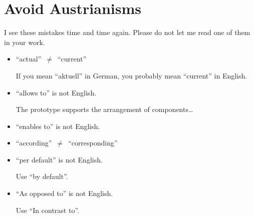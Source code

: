 \section{Avoid Austrianisms}
\label{sec:Austrianisms}


I see these mistakes time and time again. Please do not
let me read one of them in your work.



\begin{itemize}


\item \enquote{actual}~$\ne$~\enquote{current} 

If you mean \enquote{aktuell} in German, you probably mean
\enquote{current} in English.





\item \enquote{allows to} is not English.

{The prototype supports the arrangement of components\ldots}




\item \enquote{enables to} is not English.




\item \enquote{according}~$\ne$~\enquote{corresponding} 




\item \enquote{per default} is not English.

Use \enquote{by default}.





\item \enquote{As opposed to} is not English.

Use \enquote{In contrast to}.




\end{itemize}
